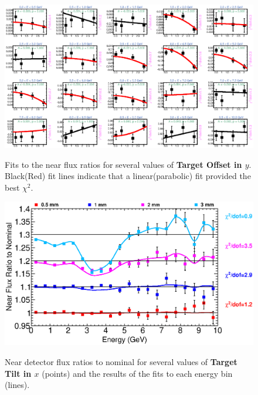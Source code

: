 {\begin{figure}[ht]
  \begin{center}
    {\includegraphics[width=5.0in]{figures/TargetYOffset_near_fits.eps}}
  \end{center}
\caption{ Fits to the near flux ratios for several values of {\bf Target Offset in $y$}. Black(Red) fit lines indicate that a linear(parabolic) fit provided the best $\chi^2$. }
\end{figure}

\begin{figure}[ht]
  \begin{center}
    {\includegraphics[width=6.0in]{figures/TargetXTilt_near_summary.eps}}
  \end{center}
\caption{ Near detector flux ratios to nominal for several values of {\bf Target Tilt in $x$} (points) and the results of the fits to each energy bin (lines).}
\end{figure}

}
